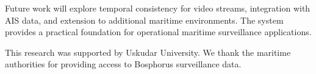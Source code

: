\documentclass[10pt]{article}
\begin{document}
Future work will explore temporal consistency for video streams, integration with AIS data, and extension to additional maritime environments. The system provides a practical foundation for operational maritime surveillance applications.

\begin{acknowledgements}
This research was supported by Uskudar University. We thank the maritime authorities for providing access to Bosphorus surveillance data.
\end{acknowledgements}



\end{document}
